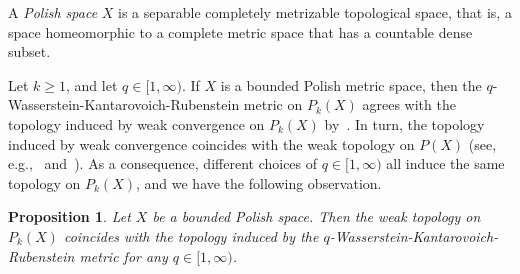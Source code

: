 \documentclass[11pt, reqno, english]{amsart}
\theoremstyle{plain}
\newtheorem{proposition}[lemma]{Proposition}
\theoremstyle{definition}
\theoremstyle{myremark}
\newcommand{\note}[1]{\textcolor{blue}{({#1})}}
\begin{document}

A \emph{Polish space} $X$ is a separable completely metrizable topological space, that is, a space homeomorphic to a complete metric space that has a countable dense subset.


Let $k\ge 1$, and let $q\in [1,\infty)$.
If $X$ is a bounded Polish metric space, then the $q$-Wasserstein-Kantarovoich-Rubenstein metric on $P_k(X)$ agrees with the topology induced by weak convergence on $P_k(X)$ by~\cite[Corollary~6.13]{villani2008optimal}.
In turn, the topology induced by weak convergence coincides with the weak topology on $P(X)$ (see, e.g.,~\cite[Definitions~8.1.1 and 8.1.2]{bogachev2007measure} and~\cite{kallianpur1961topology}).
As a consequence, different choices of $q\in [1,\infty)$ all induce the same topology on $P_k(X)$, and we have the following observation.

\begin{proposition}
\label{proposition:weaktopology}
Let $X$ be a bounded Polish space.
Then the weak topology on $P_k(X)$ coincides with the topology induced by the $q$-Wasserstein-Kantarovoich-Rubenstein metric for any $q\in [1,\infty)$.
\end{proposition}


\end{document}
